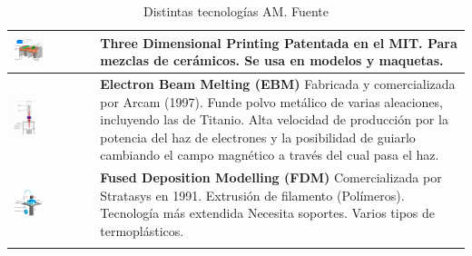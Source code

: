 \begin{longtable}{| >{\centering\arraybackslash}m{8cm} | >{\centering\arraybackslash}m{7cm}|}
     \hline
    \centering\includegraphics[width=0.4\textwidth]{./images/3d_mit.png}
    & \textbf{Three Dimensional Printing}
     Patentada en el MIT.
     Para mezclas de cerámicos.
     Se usa en modelos y maquetas.\\[95pt]
    \hline
    \centering\includegraphics[width=0.3\textwidth]{./images/ebm.png}
    & \textbf{Electron Beam Melting (EBM)}
     Fabricada y comercializada por Arcam (1997).
     Funde polvo metálico de varias aleaciones, incluyendo las de Titanio.
     Alta velocidad de producción por la potencia del haz de electrones y la posibilidad de guiarlo cambiando el campo magnético a través del cual pasa el haz.\\[80pt]
    \hline
    \centering\includegraphics[width=0.4\textwidth]{./images/fdm.png}
    & \textbf{Fused Deposition Modelling (FDM)}
     Comercializada por Stratasys en 1991.
     Extrusión de filamento (Polímeros).
     Tecnología más extendida
     Necesita soportes.
     Varios tipos de termoplásticos.\\[150pt]
     \hline


     \caption{Distintas tecnologías AM. Fuente \cite{FabricacionAditiva}}
     \label{tab:AM}
\end{longtable}

